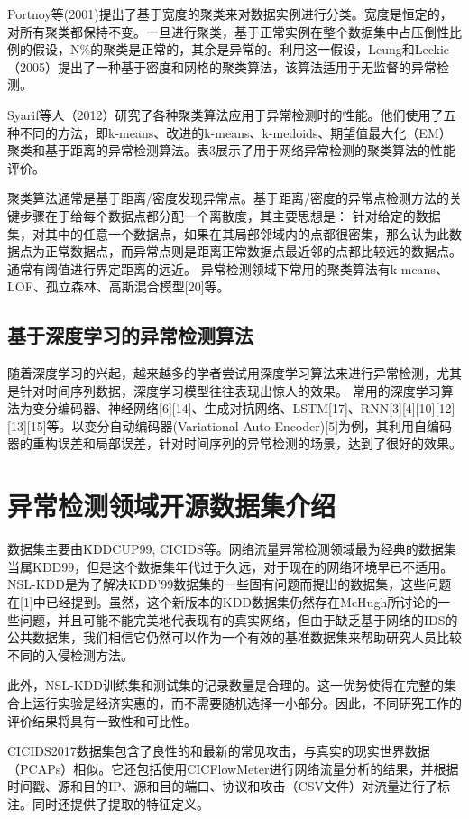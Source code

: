 Portnoy等(2001)提出了基于宽度的聚类来对数据实例进行分类。宽度是恒定的，对所有聚类都保持不变。一旦进行聚类，基于正常实例在整个数据集中占压倒性比例的假设，N\%的聚类是正常的，其余是异常的。利用这一假设，Leung和Leckie（2005）提出了一种基于密度和网格的聚类算法，该算法适用于无监督的异常检测。

Syarif等人（2012）研究了各种聚类算法应用于异常检测时的性能。他们使用了五种不同的方法，即k-means、改进的k-means、k-medoids、期望值最大化（EM）聚类和基于距离的异常检测算法。表3展示了用于网络异常检测的聚类算法的性能评价。



聚类算法通常是基于距离/密度发现异常点。基于距离/密度的异常点检测方法的关键步骤在于给每个数据点都分配一个离散度，其主要思想是：
针对给定的数据集，对其中的任意一个数据点，如果在其局部邻域内的点都很密集，那么认为此数据点为正常数据点，而异常点则是距离正常数据点最近邻的点都比较远的数据点。通常有阈值进行界定距离的远近。
异常检测领域下常用的聚类算法有k-means、LOF、孤立森林、高斯混合模型[20]等。

\subsection{基于深度学习的异常检测算法}
随着深度学习的兴起，越来越多的学者尝试用深度学习算法来进行异常检测，尤其是针对时间序列数据，深度学习模型往往表现出惊人的效果。
常用的深度学习算法为变分编码器、神经网络[6][14]、生成对抗网络、LSTM[17]、RNN[3][4][10][12][13][15]等。以变分自动编码器(Variational Auto-Encoder)[5]为例，其利用自编码器的重构误差和局部误差，针对时间序列的异常检测的场景，达到了很好的效果。

\section{异常检测领域开源数据集介绍}
数据集主要由KDDCUP99, CICIDS等。网络流量异常检测领域最为经典的数据集当属KDD99，但是这个数据集年代过于久远，对于现在的网络环境早已不适用。 NSL-KDD是为了解决KDD'99数据集的一些固有问题而提出的数据集，这些问题在[1]中已经提到。虽然，这个新版本的KDD数据集仍然存在McHugh所讨论的一些问题，并且可能不能完美地代表现有的真实网络，但由于缺乏基于网络的IDS的公共数据集，我们相信它仍然可以作为一个有效的基准数据集来帮助研究人员比较不同的入侵检测方法。

此外，NSL-KDD训练集和测试集的记录数量是合理的。这一优势使得在完整的集合上运行实验是经济实惠的，而不需要随机选择一小部分。因此，不同研究工作的评价结果将具有一致性和可比性。

CICIDS2017数据集包含了良性的和最新的常见攻击，与真实的现实世界数据（PCAPs）相似。它还包括使用CICFlowMeter进行网络流量分析的结果，并根据时间戳、源和目的IP、源和目的端口、协议和攻击（CSV文件）对流量进行了标注。同时还提供了提取的特征定义。

